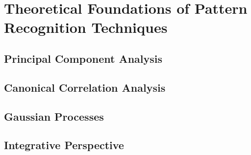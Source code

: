 
\chapter{Theoretical Foundations of Pattern Recognition Techniques}

\ifpdf
    \graphicspath{{chapter2/figs/raster/}{chapter2/figs/pdf/}{chapter2/figs/}}
\else
    \graphicspath{{chapter2/figs/vector/}{chapter2/figs/}}
\fi


\section{Principal Component Analysis}



\section{Canonical Correlation Analysis}

\section{Gaussian Processes}


\section{Integrative Perspective}

\clearpage

